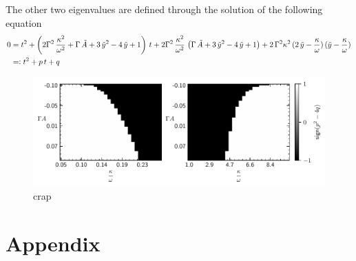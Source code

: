 \documentclass{article}
\begin{document}
The other two eigenvalues are defined through the solution of the following equation
\begin{align*}
    0&=t^2+\left( 2\Gamma^2\,\frac{\kappa^2}{\omega^2}+\Gamma\,\tilde{A}+3\,\tilde{y}^2-4\,\tilde{y}+1  \right)\,t+2\Gamma^2\,\frac{\kappa^2}{\omega^2}\,\left( \Gamma\,\tilde{A}+3\,\tilde{y}^2-4\,\tilde{y}+1 \right)+2\,\Gamma^2\kappa^2\,(2\,\tilde{y}-\frac{\kappa}{\omega})\,(\tilde{y}-\frac{\kappa}{\omega})\\
    &=\vcentcolon t^2+p\,t+q
\end{align*}

\begin{figure}[H]
    \centering
    \includegraphics{pictures/sign_of_ev2_fix1.pdf}
    \caption{crap}
\end{figure}





\newpage
\appendix
\section*{Appendix}
\end{document}
